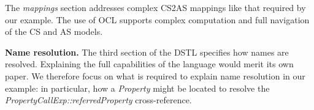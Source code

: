 \documentclass{llncs}
\begin{document}
The \textit{mappings} section addresses complex CS2AS mappings like that required by our example. The use of OCL supports  complex computation and full navigation of the CS and AS models. %



\textbf{Name resolution.}
The third section of the DSTL specifies how names are resolved. %
Explaining the full capabilities of the language would merit its own paper. We therefore focus on what is required to explain name resolution in our example: in particular, how a \textit{Property} might be located to resolve the \textit{PropertyCallExp::referredProperty} cross-reference.

\end{document}
